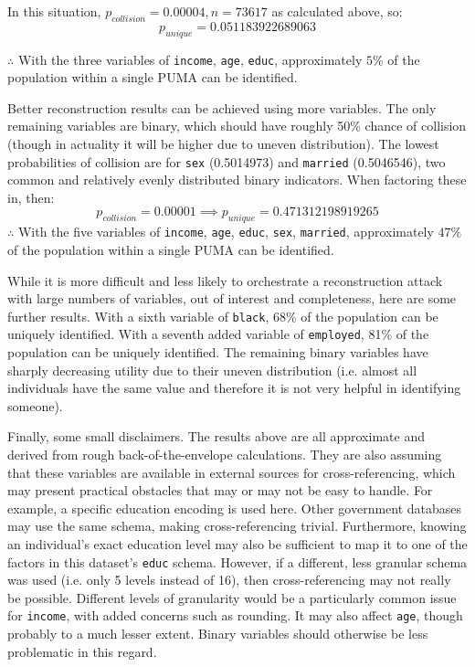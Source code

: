 \documentclass[12pt]{article}
\begin{document}
In this situation, $p_{collision} = 0.00004, n = 73617$ as calculated above, so:
\[p_{unique} = 0.051183922689063\]

$\therefore$ With the three variables of \texttt{income}, \texttt{age}, \texttt{educ}, approximately $\boxed{5\%}$ of the population within a single PUMA can be identified.

Better reconstruction results can be achieved using more variables. The only remaining variables are binary, which should have roughly 50\% chance of collision (though in actuality it will be higher due to uneven distribution). The lowest probabilities of collision are for \texttt{sex} (0.5014973) and \texttt{married} (0.5046546), two common and relatively evenly distributed binary indicators. When factoring these in, then:
\[p_{collision} = 0.00001 \implies p_{unique} = 0.471312198919265\]
$\therefore$ With the five variables of \texttt{income}, \texttt{age}, \texttt{educ}, \texttt{sex}, \texttt{married}, approximately $\boxed{47\%}$ of the population within a single PUMA can be identified.

While it is more difficult and less likely to orchestrate a reconstruction attack with large numbers of variables, out of interest and completeness, here are some further results. With a sixth variable of \texttt{black}, 68\% of the population can be uniquely identified. With a seventh added variable of \texttt{employed}, 81\% of the population can be uniquely identified. The remaining binary variables have sharply decreasing utility due to their uneven distribution (i.e. almost all individuals have the same value and therefore it is not very helpful in identifying someone).

Finally, some small disclaimers. The results above are all approximate and derived from rough back-of-the-envelope calculations. They are also assuming that these variables are available in external sources for cross-referencing, which may present practical obstacles that may or may not be easy to handle. For example, a specific education encoding is used here. Other government databases may use the same schema, making cross-referencing trivial. Furthermore, knowing an individual's exact education level may also be sufficient to map it to one of the factors in this dataset's \texttt{educ} schema. However, if a different, less granular schema was used (i.e. only 5 levels instead of 16), then cross-referencing may not really be possible. Different levels of granularity would be a particularly common issue for \texttt{income}, with added concerns such as rounding. It may also affect \texttt{age}, though probably to a much lesser extent. Binary variables should otherwise be less problematic in this regard.\\
\pagebreak
\end{document}
